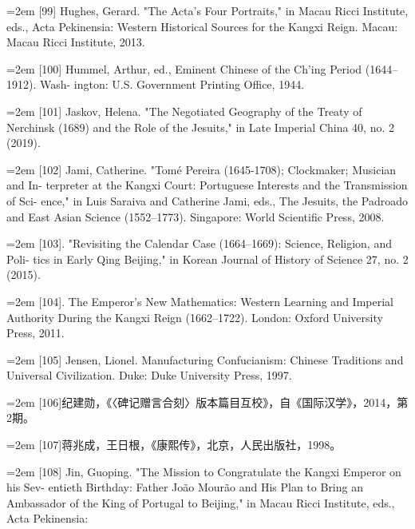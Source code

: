 \noindent\hangindent=2em
[99] Hughes, Gerard. "The Acta's Four Portraits," in Macau Ricci Institute, eds., Acta%
\space%
Pekinensia: Western Historical Sources for the Kangxi Reign. Macau: Macau Ricci%
\space%
Institute, 2013.%
\par
\noindent\hangindent=2em
[100] Hummel, Arthur, ed., Eminent Chinese of the Ch’ing Period (1644–1912). Wash-%
ington: U.S. Government Printing Office, 1944.%
\par
\noindent\hangindent=2em
[101] Jaskov, Helena. "The Negotiated Geography of the Treaty of Nerchinsk (1689)%
\space%
and the Role of the Jesuits," in Late Imperial China 40, no. 2 (2019).%
\par
\noindent\hangindent=2em
[102] Jami, Catherine. "Tomé Pereira (1645-1708); Clockmaker; Musician and In-%
terpreter at the Kangxi Court: Portuguese Interests and the Transmission of Sci-%
ence," in Luis Saraiva and Catherine Jami, eds., The Jesuits, the Padroado and East%
\space%
Asian Science (1552–1773). Singapore: World Scientific Press, 2008.%
\par
\noindent\hangindent=2em
[103]. "Revisiting the Calendar Case (1664–1669): Science, Religion, and Poli-%
tics in Early Qing Beijing," in Korean Journal of History of Science 27, no. 2 (2015).%
\par
\noindent\hangindent=2em
[104]. The Emperor's New Mathematics: Western Learning and Imperial Authority%
\space%
During the Kangxi Reign (1662–1722). London: Oxford University Press, 2011.%
\par
\noindent\hangindent=2em
[105] Jensen, Lionel. Manufacturing Confucianism: Chinese Traditions and Universal%
\space%
Civilization. Duke: Duke University Press, 1997.%
\par
\noindent\hangindent=2em
[106]纪建勋，《〈碑记赠言合刻〉版本篇目互校》，自《国际汉学》，2014，第2期。%
\par
\noindent\hangindent=2em
[107]蒋兆成，王日根，《康熙传》，北京，人民出版社，1998。%
\par
\noindent\hangindent=2em
[108] Jin, Guoping. "The Mission to Congratulate the Kangxi Emperor on his Sev-%
entieth Birthday: Father João Mourão and His Plan to Bring an Ambassador of%
\space%
the King of Portugal to Beijing," in Macau Ricci Institute, eds., Acta Pekinensia:%
